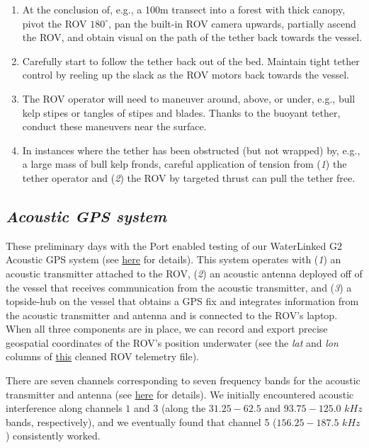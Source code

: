 \documentclass[11pt]{article}
\begin{document}
\begin{enumerate}
\item
At the conclusion of, e.g., a 100m transect into a forest with thick 
canopy, pivot the ROV $180^\circ$, pan the built-in ROV camera upwards, 
partially ascend the ROV, and obtain visual on the path of the tether 
back towards the vessel. 
\item
Carefully start to follow the tether back out of the bed. 
Maintain tight tether control by reeling up the slack as the ROV motors 
back towards the vessel. 
\item
The ROV operator will need to maneuver around, above, or under, e.g., 
bull kelp stipes or tangles of stipes and blades.
Thanks to the buoyant tether, conduct these maneuvers near the surface.
\item
In instances where the tether has been obstructed (but not wrapped) by, 
e.g., a large mass of bull kelp fronds, careful application of tension 
from (\textit{1}) the tether operator and (\textit{2}) the ROV by 
targeted thrust can pull the tether free. 
\end{enumerate} 

\subsection{\textit{Acoustic GPS system}}
These preliminary days with the Port enabled testing of our WaterLinked 
G2 Acoustic GPS system (see 
\href{https://waterlinked.github.io/underwater-gps/introduction/}{here} 
for details). 
This system operates with 
(\textit{1}) an acoustic transmitter attached to the ROV, 
(\textit{2}) an acoustic antenna deployed off of the vessel that 
receives communication from the acoustic transmitter, and 
(\textit{3}) a topside-hub on the vessel that obtains a GPS fix and 
integrates information from the acoustic transmitter and antenna and is 
connected to the ROV's laptop.
When all three components are in place, we can record and export 
precise geospatial coordinates of the ROV's position underwater (see 
the \textit{lat} and \textit{lon} columns of 
\href{https://github.com/zhrandell/Seattle_Aquarium_ROV_telemetry_imagery_analysis/blob/15b0c253a3292df240f1559ae9e0f73d25d6be66/ROV_telemetry/Cleaned/2022-08-15_11-57-51.csv}{this}
 cleaned ROV telemetry file). 

There are seven channels corresponding to seven frequency bands for 
the acoustic transmitter and antenna (see 
\href{https://waterlinked.github.io/underwater-gps/gui/settings/}{here} 
for details).
We initially encountered acoustic interference along channels $1$ and 
$3$ (along the $31.25-62.5$ and $93.75-125.0$ $kHz$ bands, 
respectively), and we eventually found that channel 5 ($156.25-187.5$ 
$kHz$) consistently worked. 
 
\end{document}

